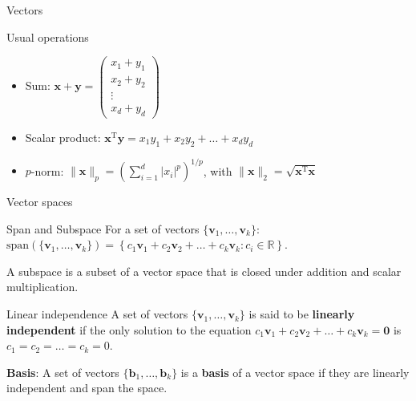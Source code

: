 \documentclass[aspectratio=1610]{beamer}
\begin{document}
\begin{frame}{Vectors}
  \begin{block}{Usual operations}
    \begin{itemize}
      \item Sum: $\mathbf{x} + \mathbf{y} = \begin{pmatrix} x_1 + y_1 \\ x_2 + y_2 \\ \vdots \\ x_d + y_d \end{pmatrix}$
      \item Scalar product: $\mathbf{x}^\mathrm{T}\mathbf{y} = x_1 y_1 + x_2 y_2 + \dots + x_d y_d$
      \item $p$-norm: $\|\mathbf{x}\|_p = \left(\sum_{i=1}^d |x_i|^p\right)^{1/p}$, with $\|\mathbf{x}\|_2 = \sqrt{\mathbf{x}^\mathrm{T}\mathbf{x}}$
    \end{itemize}
  \end{block}
\end{frame}

\begin{frame}{Vector spaces}

  \begin{block}{Span and Subspace}
    For a set of vectors $\{\mathbf{v}_1, \ldots, \mathbf{v}_k\}$:
    $
      \mathrm{span}(\{\mathbf{v}_1, \ldots, \mathbf{v}_k\}) = \left\{ c_1\mathbf{v}_1 + c_2\mathbf{v}_2 + \ldots + c_k\mathbf{v}_k : c_i \in \mathbb{R} \right\}
    $.

    A subspace is a subset of a vector space that is closed under addition and scalar multiplication.
  \end{block}

  \begin{block}{Linear independence}
    A set of vectors $\{\mathbf{v}_1, \ldots, \mathbf{v}_k\}$ is said to be \textbf{linearly independent} if the only solution to the equation $c_1\mathbf{v}_1 + c_2\mathbf{v}_2 + \ldots + c_k\mathbf{v}_k = \mathbf{0}$ is $c_1 = c_2 = \ldots = c_k = 0$.
  \end{block}

  \textbf{Basis}: A set of vectors $\{\mathbf{b}_1, \ldots, \mathbf{b}_k\}$ is a \textbf{basis} of a vector space if they are linearly independent and span the space. 
\end{frame}
\end{document}
